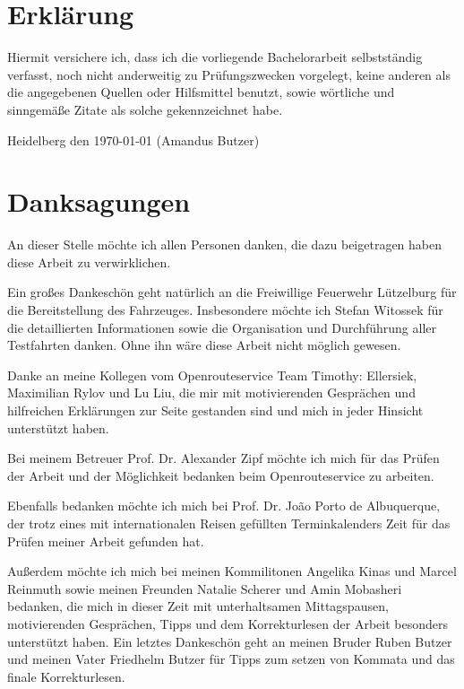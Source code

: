 \newpage
\section*{Erklärung}
\vspace{1cm}
Hiermit versichere ich, dass ich die vorliegende Bachelorarbeit selbstständig verfasst, noch nicht anderweitig zu Prüfungszwecken vorgelegt, keine anderen als die angegebenen Quellen oder Hilfsmittel benutzt, sowie wörtliche und sinngemäße Zitate als solche gekennzeichnet habe.\par
\bigskip

{\flushleft Heidelberg den \today }
{\flushright\vspace{-0.4cm}\hfill (Amandus Butzer)      }

\newpage
\section*{Danksagungen}

An dieser Stelle möchte ich allen Personen danken, die dazu beigetragen haben diese Arbeit zu verwirklichen.\par
\vspace{0.5cm}
Ein großes Dankeschön geht natürlich an die Freiwillige Feuerwehr Lützelburg für die Bereitstellung des Fahrzeuges.
Insbesondere möchte ich Stefan Witossek für die detaillierten Informationen sowie die Organisation und Durchführung aller Testfahrten danken.
Ohne ihn wäre diese Arbeit nicht möglich gewesen.\par
\vspace{0.5cm}
Danke an meine Kollegen vom Openrouteservice Team Timothy: Ellersiek, Maximilian Rylov und Lu Liu, die mir mit motivierenden Gesprächen und hilfreichen Erklärungen zur Seite gestanden sind und mich in jeder Hinsicht unterstützt haben.\par
\vspace{0.5cm}
Bei meinem Betreuer Prof. Dr. Alexander Zipf möchte ich mich für das Prüfen der Arbeit und der Möglichkeit bedanken beim Openrouteservice zu arbeiten.\par
Ebenfalls bedanken möchte ich mich bei Prof. Dr. Jo\~ao Porto de Albuquerque, der trotz eines mit internationalen Reisen gefüllten Terminkalenders Zeit für das Prüfen meiner Arbeit gefunden hat.\par
\vspace{0.5cm}
Außerdem möchte ich mich bei meinen Kommilitonen Angelika Kinas und Marcel Reinmuth sowie meinen Freunden Natalie Scherer und Amin Mobasheri bedanken, die mich in dieser Zeit mit unterhaltsamen Mittagspausen, motivierenden Gesprächen, Tipps und dem Korrekturlesen der Arbeit besonders unterstützt haben.
\vspace{0.5cm}
Ein letztes Dankeschön geht an meinen Bruder Ruben Butzer und meinen Vater Friedhelm Butzer für Tipps zum setzen von Kommata und das finale Korrekturlesen.

\newpage
\vspace{1cm}

